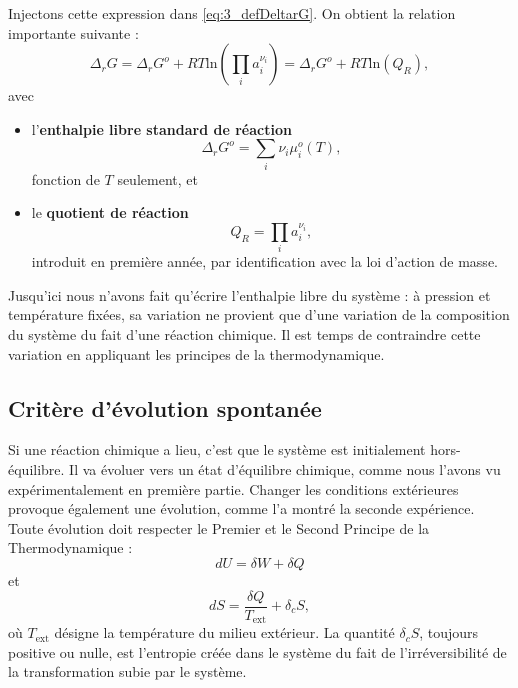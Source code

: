 \documentclass[11pt,a4paper]{report}
\begin{document}
Injectons cette expression dans \eqref{eq:3_defDeltarG}. On obtient la relation importante suivante :
\begin{equation}
	\boxed{\Delta_r G = \Delta_r G^o + RT \text{ln} \left(\prod_i a_i^{\nu_i}\right) =  \Delta_r G^o  + RT \text{ln}(Q_R)},
	\label{eq:6_deltargQ}
\end{equation}
avec 
\begin{itemize}
	\item l'\textbf{enthalpie libre standard de réaction}
	\begin{equation}
		\Delta_r G^o = \sum_i \nu_i \mu_i^o(T),
	\end{equation}
	fonction de $T$ seulement, et
	\item le \textbf{quotient de réaction} 
	\begin{equation}
		Q_R = \prod_i a_i^{\nu_i},
	\end{equation}
	introduit en première année, par identification avec la loi d'action de masse.\\
\end{itemize}

Jusqu'ici nous n'avons fait qu'écrire l'enthalpie libre du système : à pression et température fixées, sa variation ne provient que d'une variation de la composition du système du fait d'une réaction chimique. Il est temps de contraindre cette variation en appliquant les principes de la thermodynamique.

\subsection{Critère d'évolution spontanée}

Si une réaction chimique a lieu, c'est que le système est initialement hors-équilibre. Il va évoluer vers un état d'équilibre chimique, comme nous l'avons vu expérimentalement en première partie. Changer les conditions extérieures provoque également une évolution, comme l'a montré la seconde expérience. Toute évolution doit respecter le Premier et le Second Principe de la Thermodynamique :
\begin{equation}
	dU = \delta W + \delta Q
\end{equation}
et
\begin{equation}
	dS = \frac{\delta Q}{T_\text{ext}} + \delta_c S,
\end{equation}
où $T_\text{ext}$ désigne la température du milieu extérieur. La quantité $\delta_c S$, toujours positive ou nulle, est l'entropie créée dans le système du fait de l'irréversibilité de la transformation subie par le système.\\
\end{document}
